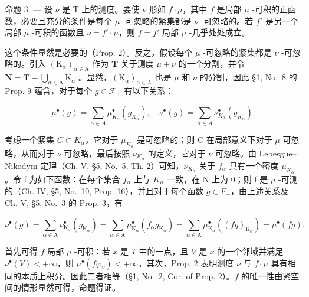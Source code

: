 命题 3. --- 设 \(\nu\) 是 T 上的测度。要使 \(\nu\) 形如 \(f \cdot \mu\)，其中 \(f\) 是局部 \(\mu\) -可积的正函数，必要且充分的条件是每个 \(\mu\) -可忽略的紧集都是 \(\nu\) -可忽略的。若 \(f'\) 是另一个局部 \(\mu\) -可积的函数且 \(\nu = f' \cdot \mu\)，则 \(f = f'\) 局部 \(\mu\) -几乎处处成立。

这个条件显然是必要的（Prop. 2）。反之，假设每个 \(\mu\) -可忽略的紧集都是 \(\nu\) -可忽略的。引入 \((\mathrm{K}_{\alpha})_{\alpha \in \mathrm{A}}\) 作为 \(\mathbf{T}\) 关于测度 \(\mu + \nu\) 的一个分割，并令 \(\mathbf{N} = \mathbf{T} - \bigcup_{\alpha \in \mathrm{A}} \mathrm{K}_{\alpha}\) 。显然，\((\mathrm{K}_{\alpha})_{\alpha \in \mathrm{A}}\) 也是 \(\mu\) 和 \(\nu\) 的分割，因此 §1, No.~8 的 Prop. 9 蕴含，对于每个 \(g \in \mathcal{F}_+\) 有以下关系：

\[
\mu^ {\bullet} (g) = \sum_ {\alpha \in A} \mu_ {K _ {\alpha}} ^ {\bullet} \left(g _ {K _ {\alpha}}\right), \quad \nu^ {\bullet} (g) = \sum_ {\alpha \in A} \nu_ {K _ {\alpha}} ^ {\bullet} \left(g _ {K _ {\alpha}}\right).
\]

考虑一个紧集 \(C \subset K_{\alpha}\)，它对于 \(\mu_{K_{\alpha}}\) 是可忽略的；则 C 在局部意义下对于 \(\mu\) 可忽略，从而对于 \(\nu\) 可忽略，最后按照 \(\nu_{K_{\alpha}}\) 的定义，它对于 \(\nu\) 可忽略。由 Lebesgue--Nikodym 定理（Ch. V, §5, No.~5, Th. 2）可知，\(\nu_{K_{\alpha}}\) 关于 \(f_{\alpha}\) 具有一个密度 \(\mu_{K_{\alpha}}\)。令 f 为如下函数：在每个集合 \(f_{\alpha}\) 上与 \(K_{\alpha}\) 一致，在 N 上为 0；则 f 是 \(\mu\) -可测的（Ch. IV, §5, No.~10, Prop. 16），并且对于每个函数 \(g \in F_{+}\)，由上述关系及 Ch. V, §5, No.~3 的 Prop. 3，有

\[
\nu^ {\bullet} (g) = \sum_ {\alpha \in \mathrm{A}} \nu_ {\mathrm{K} _ {\alpha}} ^ {\bullet} \left(g _ {\mathrm{K} _ {\alpha}}\right) = \sum_ {\alpha \in \mathrm{A}} \mu_ {\mathrm{K} _ {\alpha}} ^ {\bullet} \left(f _ {\alpha} g _ {\mathrm{K} _ {\alpha}}\right) = \sum_ {\alpha \in \mathrm{A}} \mu_ {\mathrm{K} _ {\alpha}} ^ {\bullet} ((f g) _ {\mathrm{K} _ {\alpha}}) = \mu^ {\bullet} (f g).
\]

首先可得 \(f\) 局部 \(\mu\) -可积：若 \(x\) 是 \(T\) 中的一点，且 \(V\) 是 \(x\) 的一个邻域并满足 \(\nu^{\bullet}(V) < +\infty\)，则 \(\mu^{\bullet}(f\varphi_V) < +\infty\)。其次，Prop. 2 表明测度 \(\nu\) 与 \(f \cdot \mu\) 具有相同的本质上积分。因此二者相等（§1, No.~2, Cor. of Prop. 2）。\(f\) 的唯一性由紧空间的情形显然可得，命题得证。

